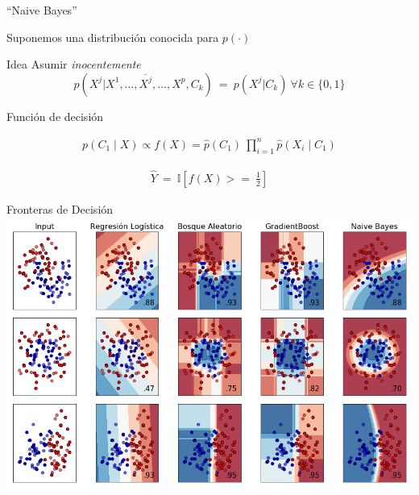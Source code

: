 \documentclass[xcolor=x11names]{beamer}
\begin{document}


\begin{frame}{``Naive Bayes''}

Suponemos una distribución conocida para $p(\cdot)$
	\begin{block}{Idea}
		Asumir \textit{inocentemente}
		$$p(X^j |X^1,\ldots,\overline{X^j},\ldots,X^p, C_k) \ = \ p(X^j | C_k) \ \forall k \in \{0,1\}$$
	\end{block}

	\begin{block}{Función de decisión }

		\begin{align*}
			p(C_1 \mid X) \propto f(X) = \hat{p}(C_{1}) \  \prod_{i=1}^{n} \hat{p}(X_{i}\mid C_{1})
		\end{align*}

		\begin{align*}
			\hat{Y} \ = \ \mathbb{I}\left[  f(X)  >= \ \frac{1}{2} \right]
		\end{align*}

	\end{block}
\end{frame}


\begin{frame}{Fronteras de Decisión}
		\includegraphics[width = 0.9 \paperwidth, height = 0.7 \paperheight,
										trim = 0.2 0.2 0.2 0.2cm, left, clip = true]{slides/plot_classifier_comparison.png}
\end{frame}
\end{document}

